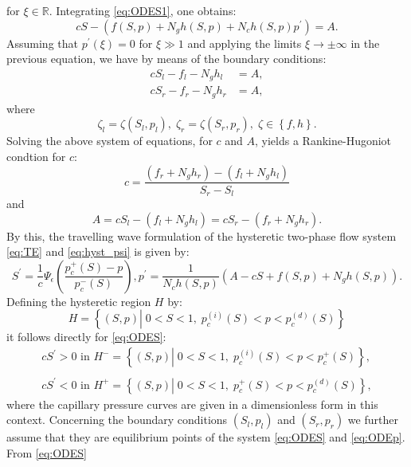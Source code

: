 \documentclass[smallextended]{svjour3}       %
\begin{document}
for $\xi \in \mathbb{R}$. Integrating \eqref{eq:ODES1}, one obtains:
$$
cS - \left(  f\left(S,p \right) + N_g h\left(S,p \right) + N_c h\left(S,p \right)p^\prime \right) = A.
$$
Assuming that $p^\prime\left( \xi \right) = 0$ for $\xi \gg 1$ and applying the limits $\xi \rightarrow \pm \infty$ in the previous equation, we have
by means of the boundary conditions:
\begin{align*}
c S_l - f_l -N_g h_l &= A, \\
c S_r - f_r -N_g h_r &= A,
\end{align*}
where
$$
\zeta_l = \zeta \left( S_l,p_l \right),\; \zeta_r = \zeta \left( S_r,p_r \right),\; \zeta \in \left\{ f,h \right\}.
$$
Solving the above system of equations, for $c$ and $A$, yields a Rankine-Hugoniot condtion for $c$:
$$
c = \frac{\left(f_r +N_g h_r \right) - \left(f_l +N_g h_l \right)}{S_r-S_l}
$$
and
$$
A = cS_l - \left(f_l +N_g h_l \right) = cS_r - \left(f_r +N_g h_r \right).
$$
By this, the travelling wave formulation of the hysteretic two-phase flow system \eqref{eq:TE} and \eqref{eq:hyst_psi} is given by:
\begin{subequations}
\begin{equation}
\label{eq:ODES} 
S^\prime = \frac{1}{c} \Psi_\epsilon \left( \frac{p_c^+\left( S \right) -p}{p_c^-\left( S \right)} \right),
\end{equation}
\begin{equation}
\label{eq:ODEp}
p^\prime = \frac{1}{N_c h\left(S,p \right)} \left( A- cS + f\left(S,p\right) + N_g h\left(S,p\right)  \right). 
\end{equation}
\end{subequations}
Defining the hysteretic region $H$ by:
$$
H = \left\{ \left(S,p \right) \left|\; 0<S<1,\;p_c^{(i)}\left(S \right) < p < p_c^{(d)}\left(S \right) \right. \right\}
$$
it follows directly for \eqref{eq:ODES}:
\begin{align*}
cS^\prime > 0 \text{ in } H^- =  \left\{ \left(S,p \right) \left| \;0<S<1,\;p_c^{(i)}\left(S \right) < p < p_c^+\left(S \right) \right. \right\}, \\
\ \\
cS^\prime < 0 \text{ in } H^+ =  \left\{ \left(S,p \right) \left| \;0<S<1,\;p_c^{+}\left(S \right) < p < p_c^{(d)}\left(S \right) \right. \right\},
\end{align*}
where the capillary pressure curves are given in a dimensionless form in this context. Concerning the boundary conditions $\left(S_l,p_l \right)$ and
$\left( S_r,p_r \right)$ we further assume that they are equilibrium points of the system \eqref{eq:ODES} and \eqref{eq:ODEp}. From \eqref{eq:ODES}
\end{document}
